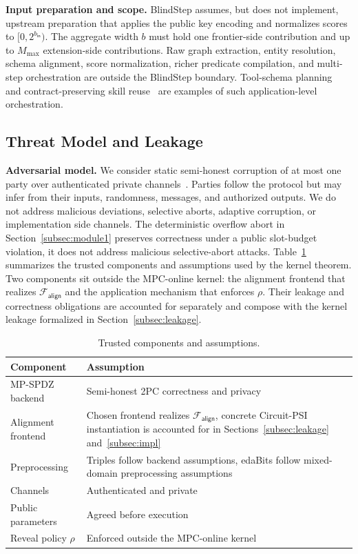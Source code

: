 \documentclass[conference,compsoc,letterpaper]{IEEEtran}
\theoremstyle{definition}
\theoremstyle{remark}
\newcommand{\BlindStep}{BlindStep\xspace}
\newcommand{\Falign}{\mathcal{F}_{\mathsf{align}}}
\newcommand{\Mmax}{M_{\max}}
\newcommand{\policy}{\rho}
\newcommand{\scorebits}{b}
\begin{document}
\noindent\textbf{Input preparation and scope.}
\BlindStep{} assumes, but does not implement, upstream preparation that applies the public key encoding and normalizes scores to $[0,2^{b_{\mathsf{in}}})$.
The aggregate width $\scorebits$ must hold one frontier-side contribution and up to $\Mmax$ extension-side contributions.
Raw graph extraction, entity resolution, schema alignment, score normalization, richer predicate compilation, and multi-step orchestration are outside the \BlindStep{} boundary.
Tool-schema planning~\cite{zhai2026hyperagent} and contract-preserving skill reuse~\cite{tan2026skillzip} are examples of such application-level orchestration.

\subsection{Threat Model and Leakage}
\label{subsec:threat_model}

\noindent\textbf{Adversarial model.}
We consider static semi-honest corruption of at most one party over authenticated private channels~\cite{oded2009foundations,lindell2017simulate}.
Parties follow the protocol but may infer from their inputs, randomness, messages, and authorized outputs.
We do not address malicious deviations, selective aborts, adaptive corruption, or implementation side channels.
The deterministic overflow abort in Section~\ref{subsec:module1} preserves correctness under a public slot-budget violation, it does not address malicious selective-abort attacks.
Table~\ref{tab:tcb} summarizes the trusted components and assumptions used by the kernel theorem.
Two components sit outside the MPC-online kernel: the alignment frontend that realizes $\Falign{}$ and the application mechanism that enforces $\policy$.
Their leakage and correctness obligations are accounted for separately and compose with the kernel leakage formalized in Section~\ref{subsec:leakage}.

\begin{table}[t]
\centering
\small
\setlength{\tabcolsep}{3pt}
\caption{Trusted components and assumptions.}
\label{tab:tcb}
\begin{tabular}{@{}p{}p{}@{}}
\toprule
\textbf{Component} & \textbf{Assumption} \\
\midrule
MP-SPDZ backend &
Semi-honest 2PC correctness and privacy \\
Alignment frontend &
Chosen frontend realizes $\Falign{}$, concrete Circuit-PSI instantiation
is accounted for in Sections~\ref{subsec:leakage} and~\ref{subsec:impl} \\
Preprocessing &
Triples follow backend assumptions, edaBits follow
mixed-domain preprocessing assumptions~\cite{escudero2020improved} \\
Channels &
Authenticated and private \\
Public parameters &
Agreed before execution \\
Reveal policy $\policy$ &
Enforced outside the MPC-online kernel \\
\bottomrule
\end{tabular}
\vspace{-3mm}
\end{table}
\end{document}
